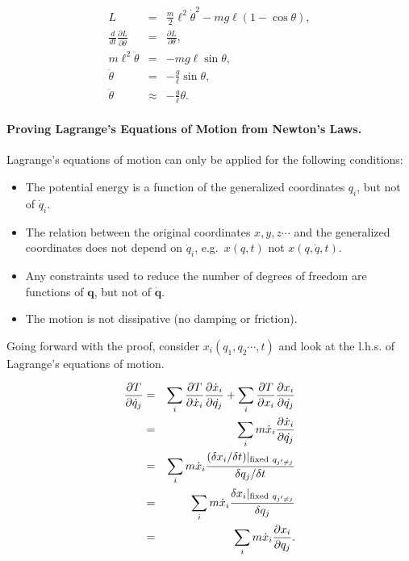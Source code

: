 \documentclass[%
oneside,                 %
final,                   %
10pt]{article}
\begin{document}
\begin{eqnarray*}
L&=&\frac{m}{2}\ell^2\dot{\theta}^2-mg\ell(1-\cos\theta),\\
\frac{d}{dt}\frac{\partial L}{\partial \dot{\theta}}&=&\frac{\partial L}{\partial \theta},\\
m\ell^2\ddot{\theta}&=&-mg\ell\sin\theta,\\
\ddot{\theta}&=&-\frac{g}{\ell}\sin\theta,\\
\ddot{\theta}&\approx&-\frac{g}{\ell}\theta.
\end{eqnarray*}

\paragraph{Proving Lagrange's Equations of Motion from Newton's Laws.}
Lagrange's equations of motion can only be applied for the following conditions:

\begin{itemize}
\item The potential energy is a function of the generalized coordinates $q_i$, but not of $\dot{q}_i$.

\item The relation between the original coordinates $x,y,z\cdots$ and the generalized coordinates does not depend on $\dot{q}_i$, e.g.~$x(q,t)$ not $x(q,\dot{q},t)$.

\item Any constraints used to reduce the number of degrees of freedom are functions of $\bm{q}$, but not of $\dot{\bm{q}}$.

\item The motion is not dissipative (no damping or friction).
\end{itemize}

\noindent
Going forward with the proof, consider $x_i(q_1,q_2\cdots,t)$ and look
at the l.h.s. of Lagrange's equations of motion.

\begin{eqnarray}
\frac{\partial T}{\partial\dot{q}_j}&=&\sum_i\frac{\partial T}{\partial\dot{x}_i}\frac{\partial\dot{x}_i}{\partial\dot{q_j}}
+\sum_i\frac{\partial T}{\partial x_i}\frac{\partial x_i}{\partial\dot{q_j}}\\
\nonumber
&=&\sum_i m\dot{x}_i\frac{\partial \dot{x}_i}{\partial\dot{q_j}}\\
\nonumber
&=&\sum_i m\dot{x}_i\frac{(\delta x_i/\delta t)|_{{\rm fixed~}q_{j'\ne j}}}{\delta q_j/\delta t}\\
\nonumber
&=&\sum_im\dot{x}_i\frac{\delta{x}_i|_{{\rm fixed~}q_{j'\ne j}}}{\delta q_j}\\
\nonumber
&=&\sum_i m\dot{x}_i\frac{\partial x_i}{\partial q_j}.
\end{eqnarray}
\end{document}
